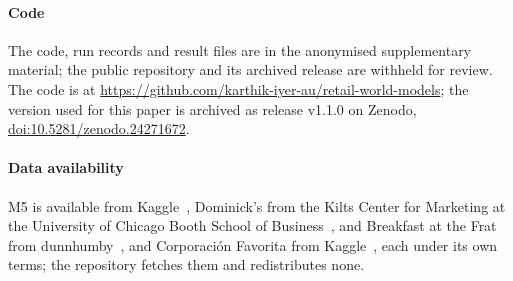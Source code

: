 \paragraph{Code}
\iftmlr The code, run records and result files are in the anonymised supplementary material; the public
repository and its archived release are withheld for review.\else
The code is at
\url{https://github.com/karthik-iyer-au/retail-world-models}; the version used
for this paper is archived as release v1.1.0 on Zenodo,
\href{https://doi.org/10.5281/zenodo.24271672}{doi:10.5281/zenodo.24271672}.\fi

\paragraph{Data availability}
M5 is available from Kaggle~\cite{m5accuracy}, Dominick's from the Kilts Center
for Marketing at the University of Chicago Booth School of
Business~\cite{dominicks}, and Breakfast at the Frat from
dunnhumby~\cite{frat}, and Corporaci\'on Favorita from
Kaggle~\cite{favorita}, each under its own terms; the repository fetches them and
redistributes none.

